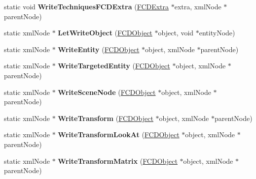 \begin{DoxyCompactItemize}
\item 
\hypertarget{classFArchiveXML_afac50dcd3e52cce8b94a810ea3f50234}{
static void {\bfseries WriteTechniquesFCDExtra} (\hyperlink{classFCDExtra}{FCDExtra} $\ast$extra, xmlNode $\ast$parentNode)}
\label{classFArchiveXML_afac50dcd3e52cce8b94a810ea3f50234}

\item 
\hypertarget{classFArchiveXML_a069847f89d00cb2b3e20f2f27933d755}{
static xmlNode $\ast$ {\bfseries LetWriteObject} (\hyperlink{classFCDObject}{FCDObject} $\ast$object, void $\ast$entityNode)}
\label{classFArchiveXML_a069847f89d00cb2b3e20f2f27933d755}

\item 
\hypertarget{classFArchiveXML_a807a0857dcb5d4fe348010a1f10bfa02}{
static xmlNode $\ast$ {\bfseries WriteEntity} (\hyperlink{classFCDObject}{FCDObject} $\ast$object, xmlNode $\ast$parentNode)}
\label{classFArchiveXML_a807a0857dcb5d4fe348010a1f10bfa02}

\item 
\hypertarget{classFArchiveXML_a32954c23bd8602eee6aa0a8a64334923}{
static xmlNode $\ast$ {\bfseries WriteTargetedEntity} (\hyperlink{classFCDObject}{FCDObject} $\ast$object, xmlNode $\ast$parentNode)}
\label{classFArchiveXML_a32954c23bd8602eee6aa0a8a64334923}

\item 
\hypertarget{classFArchiveXML_a2ddd4c06e787a167f3f5797db1a43216}{
static xmlNode $\ast$ {\bfseries WriteSceneNode} (\hyperlink{classFCDObject}{FCDObject} $\ast$object, xmlNode $\ast$parentNode)}
\label{classFArchiveXML_a2ddd4c06e787a167f3f5797db1a43216}

\item 
\hypertarget{classFArchiveXML_a7a3d7ea3aec2b18562bf0203a56af303}{
static xmlNode $\ast$ {\bfseries WriteTransform} (\hyperlink{classFCDObject}{FCDObject} $\ast$object, xmlNode $\ast$parentNode)}
\label{classFArchiveXML_a7a3d7ea3aec2b18562bf0203a56af303}

\item 
\hypertarget{classFArchiveXML_a32ce577d0c71a7f753a03fcfb139449e}{
static xmlNode $\ast$ {\bfseries WriteTransformLookAt} (\hyperlink{classFCDObject}{FCDObject} $\ast$object, xmlNode $\ast$parentNode)}
\label{classFArchiveXML_a32ce577d0c71a7f753a03fcfb139449e}

\item 
\hypertarget{classFArchiveXML_aedf251f66e2ab6dc68d8041c4ac7a754}{
static xmlNode $\ast$ {\bfseries WriteTransformMatrix} (\hyperlink{classFCDObject}{FCDObject} $\ast$object, xmlNode $\ast$parentNode)}
\label{classFArchiveXML_aedf251f66e2ab6dc68d8041c4ac7a754}


\end{DoxyCompactItemize}
